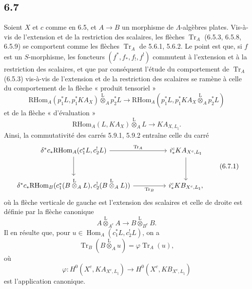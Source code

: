 \documentclass[11pt]{article}
\DeclareMathOperator{\Hom}{Hom}
\providecommand{\RHom}{\mathrm{RHom}}
\providecommand{\Tr}{\operatorname{Tr}}
\providecommand{\Tr}{\operatorname{Tr}}
\providecommand{\lten}{\overset{\mathrm L}{\otimes}}
\providecommand{\Tr}{\operatorname{Tr}}
\providecommand{\RHom}{\mathrm{RHom}}
\providecommand{\Hom}{\operatorname{Hom}}
\providecommand{\lten}{\overset{\mathrm L}{\otimes}}
\providecommand{\RHom}{\mathrm R\mathcal{H}om}
\providecommand{\lten}{\overset{\mathrm L}{\otimes}}
\providecommand{\Tr}{\operatorname{Tr}}
\providecommand{\lten}{\overset{\mathrm L}{\otimes}}
\providecommand{\lten}{\overset{\mathrm L}{\otimes}}
\providecommand{\lten}{\overset{\mathrm L}{\otimes}}
\providecommand{\RHom}{\mathrm{RHom}}
\providecommand{\Hom}{\operatorname{Hom}}
\providecommand{\Tr}{\operatorname{Tr}}
\providecommand{\lten}{\overset{\mathrm L}{\otimes}}
\begin{document}
\subsection*{6.7}
Soient $X$ et $c$ comme en 6.5, et $A\to B$ un morphisme de $\Lambda$-algèbres plates. Vis-à-vis de l'extension et de la restriction des scalaires, les flèches $\Tr_A$ (6.5.3, 6.5.8, 6.5.9) se comportent comme les flèches $\Tr_A$ de 5.6.1, 5.6.2. Le point est que, si $f$ est un $S$-morphisme, les foncteurs $(f^*,f_*,f_!,f^!)$ commutent à l'extension et à la restriction des scalaires, et que par conséquent l'étude du comportement de $\Tr_A$ (6.5.3) vis-à-vis de l'extension et de la restriction des scalaires se ramène à celle du comportement de la flèche « produit tensoriel »
\[
\RHom_A(p_1^*L,p_1^*KA_X)\lten_Ap_2^*L
\longrightarrow
\RHom_A(p_1^*L,p_1^*KA_X\lten_Ap_2^*L)
\]
et de la flèche « d'évaluation »
\[
\RHom_A(L,KA_X)\lten_A L\longrightarrow KA_{X,L_{\natural}}.
\]
Ainsi, la commutativité des carrés 5.9.1, 5.9.2 entraîne celle du carré
\begin{equation}
\begin{tikzcd}[column sep=huge,row sep=large]
\delta^*c_*\RHom_A(c_1^*L,c_2^!L) \arrow[r,"\Tr_A"] \arrow[d]
& i_*^cKA_{X^c,L_{\natural}} \arrow[d]\\
\delta^*c_*\RHom_B(c_1^*(B\lten_A L),c_2^!(B\lten_A L)) \arrow[r,"\Tr_B"']
& i_*^cKB_{X^c,L_{\natural}},
\end{tikzcd}
\tag{6.7.1}
\end{equation}
où la flèche verticale de gauche est l'extension des scalaires et celle de droite est définie par la flèche canonique
\[
A\lten_{A^e}A\longrightarrow B\lten_{B^e}B.
\]
Il en résulte que, pour $u\in\Hom_A(c_1^*L,c_2^!L)$, on a
\begin{equation}
\Tr_B(B\lten_Au)=\varphi\Tr_A(u),
\tag{6.7.2}
\end{equation}
où
\[
\varphi:H^0(X^c,KA_{X^c,L_{\natural}})\longrightarrow H^0(X^c,KB_{X^c,L_{\natural}})
\]
est l'application canonique.
\end{document}
